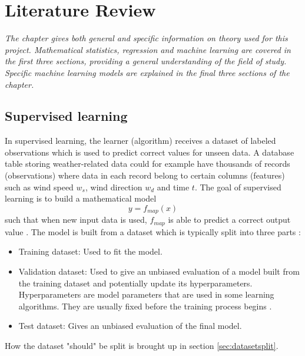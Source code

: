 \chapter{Literature Review} \label {ch:theory}
\emph{The chapter gives both general and specific information on theory used for this project.  Mathematical statistics, regression and machine learning are covered in the first three sections, providing a general understanding of the field of study. Specific machine learning models are explained in the final three sections of the chapter. }


\section{Supervised learning} \label{sec:supervisedlearning}
	In supervised learning, the learner (algorithm) receives a dataset of labeled observations which is used to predict correct values for unseen data\cite{BOOK:3}. A database table storing weather-related data could for example have thousands of records (observations) where data in each record belong to certain columns (features) such as wind speed $w_s$, wind direction $w_d$ and time $t$. The goal of supervised learning is to build a mathematical model
\begin{equation} \label{eq:mappingfunction}
	y = f_{map}(x)
\end{equation}
such that when new input data is used, $f_{map}$ is able to predict a correct output value \cite{WEBSITE:3}. The model is built from a dataset which is typically split into three parts \cite{WEBSITE:4}:

\begin{itemize}
	\item {Training dataset:} Used to fit the model.
	\item {Validation dataset:} Used to give an unbiased evaluation of a model built from the training dataset and potentially update its hyperparameters. Hyperparameters are model parameters that are used in some learning algorithms. They are usually fixed before the training process begins \cite{WEBSITE:7}.
	\item {Test dataset:} Gives an unbiased evaluation of the final model.
\end{itemize}
	How the dataset "should" be split is brought up in section \ref{sec:datasetsplit}. 

